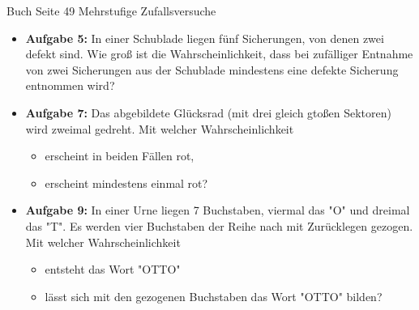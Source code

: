 \documentclass[11pt,a4paper,oneside]{article}
\begin{document}
	\begin{aufgabe}{ Buch Seite 49 Mehrstufige Zufallsversuche}
		\begin{itemize}
			\item \textbf{Aufgabe 5:} In einer Schublade liegen fünf Sicherungen, von denen zwei defekt sind. Wie groß ist die Wahrscheinlichkeit, dass bei zufälliger Entnahme von zwei Sicherungen aus der Schublade mindestens eine defekte Sicherung entnommen wird? 
			\item \textbf{Aufgabe 7:} Das abgebildete Glücksrad (mit drei gleich gtoßen Sektoren) wird zweimal gedreht. Mit welcher Wahrscheinlichkeit
			\begin{itemize}
				\item erscheint in beiden Fällen rot, 
				\item erscheint mindestens einmal rot? 
			\end{itemize}
			\item \textbf{Aufgabe 9:}
			In einer Urne liegen 7 Buchstaben, viermal das "O" und dreimal das "T". Es werden vier Buchstaben der Reihe nach mit Zurücklegen gezogen. Mit welcher Wahrscheinlichkeit
			\begin{itemize}
				\item entsteht das Wort "OTTO"
				\item lässt sich mit den gezogenen Buchstaben das Wort "OTTO" bilden? 
			\end{itemize} 
		\end{itemize}
	\end{aufgabe}	
	
\end{document}
